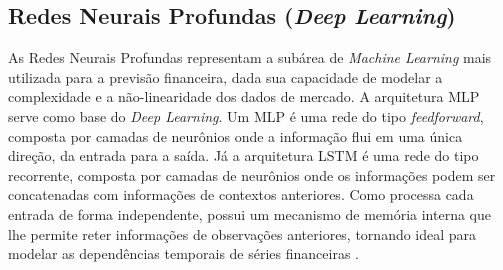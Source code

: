 \subsection{Redes Neurais Profundas (\textit{Deep Learning})}

As Redes Neurais Profundas representam a subárea de \textit{Machine Learning} mais utilizada para a previsão financeira, dada sua capacidade de modelar a complexidade e a não-linearidade dos dados de mercado. A arquitetura MLP serve como base do \textit{Deep Learning}. Um MLP é uma rede do tipo \textit{feedforward}, composta por camadas de neurônios onde a informação flui em uma única direção, da entrada para a saída. Já a arquitetura LSTM é uma rede do tipo recorrente, composta por camadas de neurônios onde os informações podem ser concatenadas com informações de contextos anteriores. Como processa cada entrada de forma independente, possui um mecanismo de memória interna que lhe permite reter informações de observações anteriores, tornando ideal para modelar as dependências temporais de séries financeiras \cite{site4}. 

